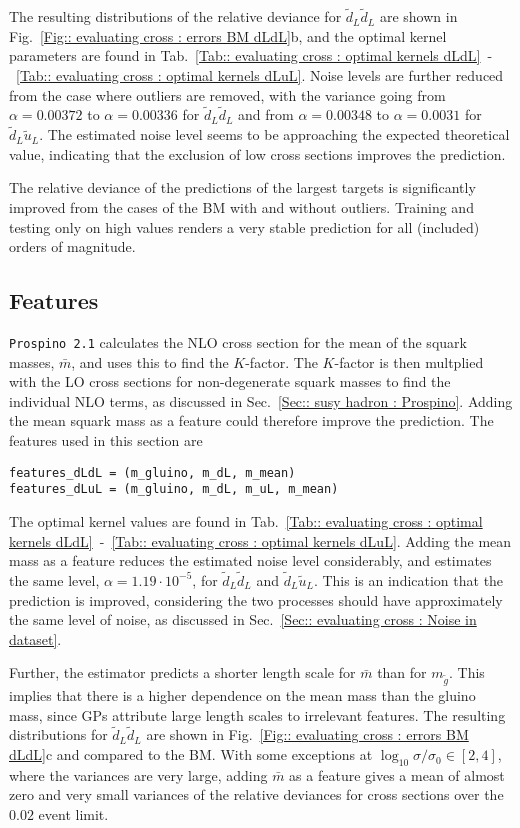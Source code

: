 \documentclass[twoside,english]{uiofysmaster}
\begin{document}
The resulting distributions of the relative deviance for $\tilde{d}_L \tilde{d}_L$ are shown in Fig.~\ref{Fig:: evaluating cross : errors BM dLdL}b, and the optimal kernel parameters are found in Tab.~\ref{Tab:: evaluating cross : optimal kernels dLdL}~-~\ref{Tab:: evaluating cross : optimal kernels dLuL}. Noise levels are further reduced from the case where outliers are removed, with the variance going from $\alpha=0.00372$ to $\alpha = 0.00336$ for $\tilde{d}_L \tilde{d}_L$ and from $\alpha=0.00348$ to $\alpha=0.0031$ for $\tilde{d}_L \tilde{u}_L$. The estimated noise level seems to be approaching the expected theoretical value, indicating that the exclusion of low cross sections improves the prediction. 

The relative deviance of the predictions of the largest targets is significantly improved from the cases of the BM with and without outliers. Training and testing only on high values renders a very stable prediction for all (included) orders of magnitude.

\subsection{Features}

\verb|Prospino 2.1| calculates the NLO cross section for the mean of the squark masses, $\bar{m}$, and uses this to find the $K$-factor. The $K$-factor is then multplied with the LO cross sections for non-degenerate squark masses to find the individual NLO terms, as discussed in Sec.~\ref{Sec:: susy hadron : Prospino}. Adding the mean squark mass as a feature could therefore improve the prediction. The features used in this section are
\begin{lstlisting}
features_dLdL = (m_gluino, m_dL, m_mean)
features_dLuL = (m_gluino, m_dL, m_uL, m_mean)
\end{lstlisting}
The optimal kernel values are found in Tab.~\ref{Tab:: evaluating cross : optimal kernels dLdL}~-~\ref{Tab:: evaluating cross : optimal kernels dLuL}. Adding the mean mass as a feature reduces the estimated noise level considerably, and estimates the same level, $\alpha = 1.19 \cdot 10^{-5}$, for $\tilde{d}_L \tilde{d}_L$ and $\tilde{d}_L \tilde{u}_L$. This is an indication that the prediction is improved, considering the two processes should have approximately the same level of noise, as discussed in Sec.~\ref{Sec:: evaluating cross : Noise in dataset}. 

Further, the estimator predicts a shorter length scale for $\bar{m}$ than for $m_{\tilde{g}}$. This implies that there is a higher dependence on the mean mass than the gluino mass, since GPs attribute large length scales to irrelevant features. The resulting distributions for $\tilde{d}_L \tilde{d}_L$ are shown in Fig.~\ref{Fig:: evaluating cross : errors BM dLdL}c and compared to the BM. With some exceptions at $\log_{10} \sigma/\sigma_0 \in [2,4]$, where the variances are very large, adding $\bar{m}$ as a feature gives a mean of almost zero and very small variances of the relative deviances for cross sections over the $0.02$ event limit. 
\end{document}
